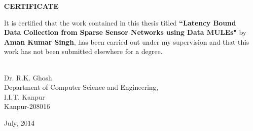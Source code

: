 \setcounter{page}{2}
\vspace*{1.0in}
\begin{center}
\begin{large}
{\bf CERTIFICATE}
\end{large}
\end{center}
\vskip 2cm
It is certified that the work contained in this thesis titled {\bf ``Latency Bound Data Collection from Sparse Sensor Networks using Data MULEs"} by {\bf Aman Kumar Singh}, has been carried out under my supervision and that this work has not been submitted elsewhere for a degree.
\vskip 1in
\begin{flushleft}
		\hspace*{5cm}{\hrulefill}\\
		\hspace*{5cm}Dr. R.K. Ghosh\\
		\hspace*{5cm}Department of Computer Science and Engineering,\\ 
		\hspace*{5cm}I.I.T. Kanpur\\
		\hspace*{5cm}Kanpur-208016
\end{flushleft}
July, 2014
\pagebreak